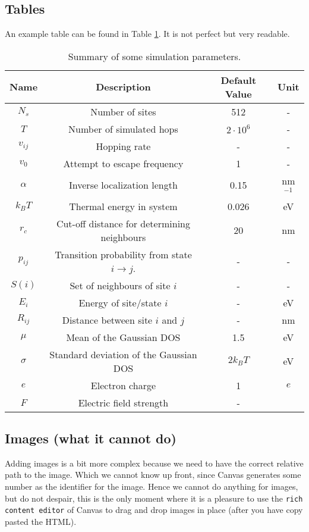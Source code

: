 \documentclass[11pt, a4paper]{article}
\begin{document}
	\subsection{Tables}
	An example table can be found in Table \ref{summary}. It is not perfect but very readable.
	\begin{table}[H]
		\centering
		\begin{tabular}{c|c|c|c }
			\hline \hline
			Name & Description &  Default Value & Unit \\ \hline
			$N_s$ & Number of sites & 512 & - \\
			$T$ & Number of simulated hops & $2\cdot 10^6$ & - \\
			$v_{ij}$ & Hopping rate & - & - \\
			$v_0$ & Attempt to escape frequency & 1 & -  \\
			$\alpha$ & Inverse localization length  & 0.15 & nm$^{-1}$  \\
			$k_B T$ & Thermal energy in system & 0.026 & eV \\
			$r_{c}$ & Cut-off distance for determining neighbours & 20 & nm \\
			$p_{ij}$ & Transition probability from state $i\rightarrow j$. & - & -\\
			$S(i)$ & Set of neighbours of site $i$ & - &- \\
			$E_i$ & Energy of site/state $i$ & - & eV \\
			$R_{ij}$ & Distance between site $i$ and $j$ & - & nm \\
			$\mu$ & Mean of the Gaussian DOS & 1.5 & eV \\
			$\sigma$ & Standard deviation of the Gaussian DOS & $2k_B T$ & eV \\
			$e$ & Electron charge & 1 & ${e}$ \\
			$F$ & Electric field strength & - & \\
			\hline
		\end{tabular}
		\caption{Summary of some simulation parameters.}\label{summary}
	\end{table}
	
	\subsection{Images (what it cannot do)}
	Adding images is a bit more complex because we need to have the correct relative path to the image. Which we cannot know up front, since Canvas generates some number as the identifier for the image. Hence we cannot do anything for images, but do not despair,  this is the only moment where it is a pleasure to use the \lstinline{rich content editor} of Canvas to drag and drop images in place (after you have copy pasted the HTML).
	
\end{document}
